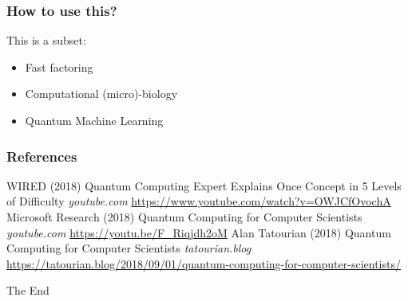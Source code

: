 \documentclass{beamer}
\begin{document}
\begin{frame}
\frametitle{How to use this?}
This is a subset:
\begin{itemize}
    \item Fast factoring
    \item Computational (micro)-biology
    \item Quantum Machine Learning
\end{itemize}
\end{frame}

\begin{frame}
\frametitle{References}
\footnotesize{
\begin{thebibliography}{99} %
 WIRED (2018)
\newblock Quantum Computing Expert Explains Once Concept in 5 Levels of Difficulty
\newblock \emph{youtube.com} \url{https://www.youtube.com/watch?v=OWJCfOvochA}
 Microsoft Research (2018)
\newblock Quantum Computing for Computer Scientists
\newblock \emph{youtube.com} \url{https://youtu.be/F_Riqjdh2oM}
 Alan Tatourian (2018)
\newblock Quantum Computing for Computer Scientists
\newblock \emph{tatourian.blog} \url{https://tatourian.blog/2018/09/01/quantum-computing-for-computer-scientists/}
\end{thebibliography}
}
\end{frame}

\begin{frame}
\Huge{\centerline{The End}}
\end{frame}
\end{document}
